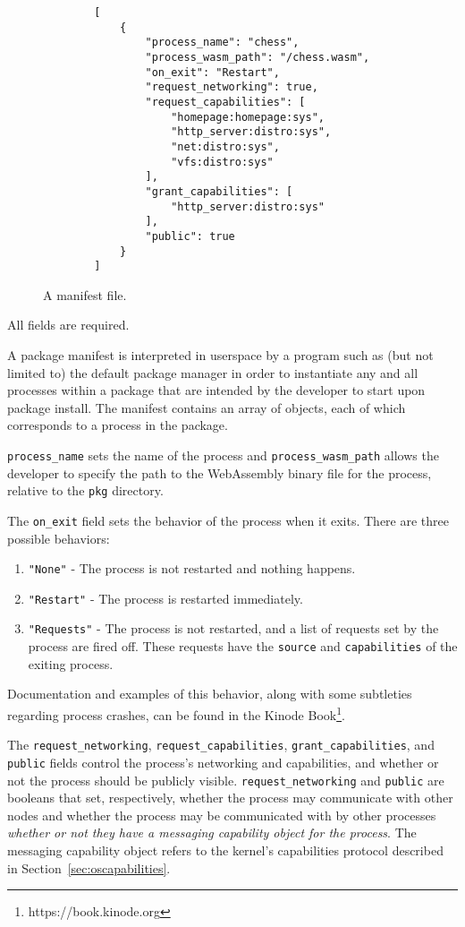 \documentclass[runningheads]{llncs}
\begin{document}
\begin{figure}[H]
    \centering
    \begin{verbatim}
        [
            {
                "process_name": "chess",
                "process_wasm_path": "/chess.wasm",
                "on_exit": "Restart",
                "request_networking": true,
                "request_capabilities": [
                    "homepage:homepage:sys",
                    "http_server:distro:sys",
                    "net:distro:sys",
                    "vfs:distro:sys"
                ],
                "grant_capabilities": [
                    "http_server:distro:sys"
                ],
                "public": true
            }
        ]
    \end{verbatim}
    \caption{A manifest file.}
    \label{fig:example manifest.json}
\end{figure}

All fields are required.

A package manifest is interpreted in userspace by a program such as (but not limited to) the default package manager in order to instantiate any and all processes within a package that are intended by the developer to start upon package install.
The manifest contains an array of objects, each of which corresponds to a process in the package.

\verb|process_name| sets the name of the process and \verb|process_wasm_path| allows the developer to specify the path to the WebAssembly binary file for the process, relative to the \verb|pkg| directory.

The \verb|on_exit| field sets the behavior of the process when it exits. There are three possible behaviors:
\begin{enumerate}
    \item \verb|"None"| - The process is not restarted and nothing happens.
	\item \verb|"Restart"| - The process is restarted immediately.
	\item \verb|"Requests"| - The process is not restarted, and a list of requests set by the process are fired off. These requests have the \verb|source| and \verb|capabilities| of the exiting process.
\end{enumerate}

Documentation and examples of this behavior, along with some subtleties regarding process crashes, can be found in the Kinode Book\footnote{https://book.kinode.org}.

The \verb|request_networking|, \verb|request_capabilities|, \verb|grant_capabilities|, and \verb|public| fields control the process's networking and capabilities, and whether or not the process should be publicly visible.
\verb|request_networking| and \verb|public| are booleans that set, respectively, whether the process may communicate with other nodes and whether the process may be communicated with by other processes \textit{whether or not they have a messaging capability object for the process}.
The messaging capability object refers to the kernel's capabilities protocol described in Section~\ref{sec:oscapabilities}.
\end{document}
